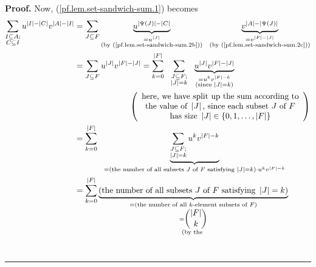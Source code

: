 \documentclass[numbers=enddot,12pt,final,onecolumn,notitlepage]{scrartcl}%
\theoremstyle{definition}
\newenvironment{proof}[1][Proof]{\noindent\textbf{#1.} }{\ \rule{0.5em}{0.5em}}
\let\sumnonlimits\sum
\renewcommand{\sum}{\sumnonlimits\limits}
\newenvironment{verlong}{}{}
\begin{document}
\begin{verlong}
\begin{proof}
Now, (\ref{pf.lem.set-sandwich-sum.1}) becomes%
\begin{align*}
\sum_{\substack{I\subseteq A;\\C\subseteq I}}u^{\left\vert I\right\vert
-\left\vert C\right\vert }v^{\left\vert A\right\vert -\left\vert I\right\vert
}  &  =\sum_{J\subseteq F}\underbrace{u^{\left\vert \Psi\left(  J\right)
\right\vert -\left\vert C\right\vert }}_{\substack{=u^{\left\vert J\right\vert
}\\\text{(by (\ref{pf.lem.set-sandwich-sum.2b}))}}%
}\ \ \underbrace{v^{\left\vert A\right\vert -\left\vert \Psi\left(  J\right)
\right\vert }}_{\substack{=v^{\left\vert F\right\vert -\left\vert J\right\vert
}\\\text{(by (\ref{pf.lem.set-sandwich-sum.2c}))}}}\\
&  =\sum_{J\subseteq F}u^{\left\vert J\right\vert }v^{\left\vert F\right\vert
-\left\vert J\right\vert }=\sum_{k=0}^{\left\vert F\right\vert }%
\ \ \sum_{\substack{J\subseteq F;\\\left\vert J\right\vert =k}%
}\ \ \underbrace{u^{\left\vert J\right\vert }v^{\left\vert F\right\vert
-\left\vert J\right\vert }}_{\substack{=u^{k}v^{\left\vert F\right\vert
-k}\\\text{(since }\left\vert J\right\vert =k\text{)}}}\\
&  \ \ \ \ \ \ \ \ \ \ \ \ \ \ \ \ \ \ \ \ \left(
\begin{array}
[c]{c}%
\text{here, we have split up the sum according to}\\
\text{the value of }\left\vert J\right\vert \text{, since each subset }J\text{
of }F\\
\text{has size }\left\vert J\right\vert \in\left\{  0,1,\ldots,\left\vert
F\right\vert \right\}
\end{array}
\right) \\
&  =\sum_{k=0}^{\left\vert F\right\vert }\ \ \underbrace{\sum
_{\substack{J\subseteq F;\\\left\vert J\right\vert =k}}u^{k}v^{\left\vert
F\right\vert -k}}_{=\left(  \text{the number of all subsets }J\text{ of
}F\text{ satisfying }\left\vert J\right\vert =k\right)  \cdot u^{k}%
v^{\left\vert F\right\vert -k}}\\
&  =\sum_{k=0}^{\left\vert F\right\vert }\underbrace{\left(  \text{the number
of all subsets }J\text{ of }F\text{ satisfying }\left\vert J\right\vert
=k\right)  }_{\substack{=\left(  \text{the number of all }k\text{-element
subsets of }F\right)  \\=\dbinom{\left\vert F\right\vert }{k}\\\text{(by the
}}}
\end{align*}
\end{proof}
\end{verlong}
\end{document}
